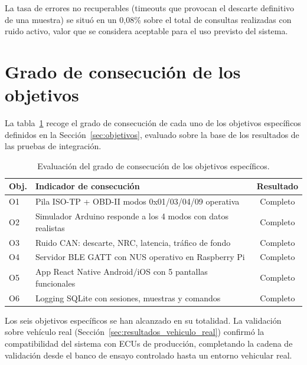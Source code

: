 La tasa de errores no recuperables (timeouts que provocan el descarte definitivo de una muestra) se situó en un 0,08\% sobre el total de consultas realizadas con ruido activo, valor que se considera aceptable para el uso previsto del sistema.


\section{Grado de consecución de los objetivos}
\label{sec:resultados_objetivos}

La tabla~\ref{tab:objetivos} recoge el grado de consecución de cada uno de los objetivos específicos definidos en la Sección~\ref{sec:objetivos}, evaluado sobre la base de los resultados de las pruebas de integración.

\begin{table}[!htbp]
\caption{Evaluación del grado de consecución de los objetivos específicos.}
\label{tab:objetivos}
\centering
\renewcommand{\arraystretch}{1.2}
\begin{tabular}{|l|p{7cm}|c|}
\hline
\textbf{Obj.} & \textbf{Indicador de consecución} & \textbf{Resultado} \\
\hline
O1 & Pila ISO-TP + OBD-II modos 0x01/03/04/09 operativa & Completo \\
O2 & Simulador Arduino responde a los 4 modos con datos realistas & Completo \\
O3 & Ruido CAN: descarte, NRC, latencia, tráfico de fondo & Completo \\
O4 & Servidor BLE GATT con NUS operativo en Raspberry Pi & Completo \\
O5 & App React Native Android/iOS con 5 pantallas funcionales & Completo \\
O6 & Logging SQLite con sesiones, muestras y comandos & Completo \\
\hline
\end{tabular}
\end{table}

Los seis objetivos específicos se han alcanzado en su totalidad. La validación sobre vehículo real (Sección~\ref{sec:resultados_vehiculo_real}) confirmó la compatibilidad del sistema con ECUs de producción, completando la cadena de validación desde el banco de ensayo controlado hasta un entorno vehicular real.
